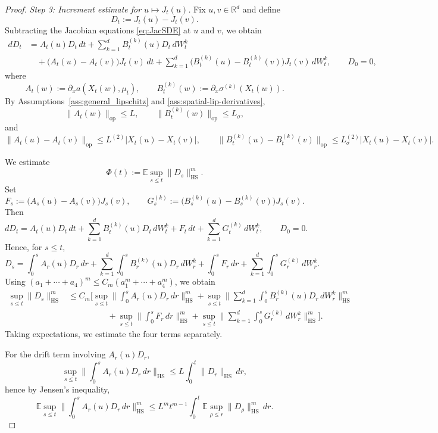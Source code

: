 \documentclass{tsp-short}
\theoremstyle{remark}
\theoremstyle{definition}
\begin{document}
\begin{proof}
\smallskip
\noindent\emph{Step 3: Increment estimate for \(u\mapsto J_t(u)\).}
Fix \(u,v\in\mathbb{R}^d\) and define
\[
D_t:=J_t(u)-J_t(v).
\]
Subtracting the Jacobian equations \eqref{eq:JacSDE} at \(u\) and \(v\), we obtain
\begin{equation}\label{eq:D-SDE-fullproof}
\begin{aligned}
dD_t
&=
A_t(u)D_t\,dt+\sum_{k=1}^d B_t^{(k)}(u)D_t\,dW_t^k \\
&\quad
+\big(A_t(u)-A_t(v)\big)J_t(v)\,dt
+\sum_{k=1}^d \big(B_t^{(k)}(u)-B_t^{(k)}(v)\big)J_t(v)\,dW_t^k,
\qquad D_0=0,
\end{aligned}
\end{equation}
where
\[
A_t(w):=\partial_x a(X_t(w),\mu_t),
\qquad
B_t^{(k)}(w):=\partial_x \sigma^{(k)}(X_t(w)).
\]
By Assumptions~\ref{ass:general_lipschitz} and \ref{ass:spatial-lip-derivatives},
\[
\|A_t(w)\|_{\mathrm{op}}\le L,
\qquad
\|B_t^{(k)}(w)\|_{\mathrm{op}}\le L_\sigma,
\]
and
\begin{equation}\label{eq:AB-difference-fullproof}
\|A_t(u)-A_t(v)\|_{\mathrm{op}}
\le L^{(2)}|X_t(u)-X_t(v)|,
\qquad
\|B_t^{(k)}(u)-B_t^{(k)}(v)\|_{\mathrm{op}}
\le L_\sigma^{(2)}|X_t(u)-X_t(v)|.
\end{equation}




We estimate
\[
\Phi(t):=\mathbb{E}\sup_{s\le t}\|D_s\|_{\mathrm{HS}}^m.
\]
Set
\[
F_s:=\big(A_s(u)-A_s(v)\big)J_s(v),
\qquad
G_s^{(k)}:=\big(B_s^{(k)}(u)-B_s^{(k)}(v)\big)J_s(v).
\]
Then
\[
dD_t
=
A_t(u)D_t\,dt+\sum_{k=1}^d B_t^{(k)}(u)D_t\,dW_t^k
+
F_t\,dt+\sum_{k=1}^d G_t^{(k)}\,dW_t^k,
\qquad D_0=0.
\]
Hence, for \(s\le t\),
\[
D_s
=
\int_0^s A_r(u)D_r\,dr
+\sum_{k=1}^d \int_0^s B_r^{(k)}(u)D_r\,dW_r^k
+\int_0^s F_r\,dr
+\sum_{k=1}^d \int_0^s G_r^{(k)}\,dW_r^k.
\]
Using \((a_1+\cdots+a_4)^m\le C_m(a_1^m+\cdots+a_4^m)\), we obtain
\begin{align*}
\sup_{s\le t}\|D_s\|_{\mathrm{HS}}^m
&\le
C_m\Bigg[
\sup_{s\le t}\Big\|\int_0^s A_r(u)D_r\,dr\Big\|_{\mathrm{HS}}^m
+
\sup_{s\le t}\Big\|\sum_{k=1}^d \int_0^s B_r^{(k)}(u)D_r\,dW_r^k\Big\|_{\mathrm{HS}}^m \\
&\hspace{2cm}
+
\sup_{s\le t}\Big\|\int_0^s F_r\,dr\Big\|_{\mathrm{HS}}^m
+
\sup_{s\le t}\Big\|\sum_{k=1}^d \int_0^s G_r^{(k)}\,dW_r^k\Big\|_{\mathrm{HS}}^m
\Bigg].
\end{align*}
Taking expectations, we estimate the four terms separately.

For the drift term involving $A_r(u)D_r$,
\[
\sup_{s\le t}\Big\|\int_0^s A_r(u)D_r\,dr\Big\|_{\mathrm{HS}}
\le
L\int_0^t \|D_r\|_{\mathrm{HS}}\,dr,
\]
hence by Jensen's inequality,
\[
\mathbb{E}\sup_{s\le t}\Big\|\int_0^s A_r(u)D_r\,dr\Big\|_{\mathrm{HS}}^m
\le
L^m t^{m-1}\int_0^t \mathbb{E}\sup_{\rho\le r}\|D_\rho\|_{\mathrm{HS}}^m\,dr.
\]


\end{proof}
\end{document}
